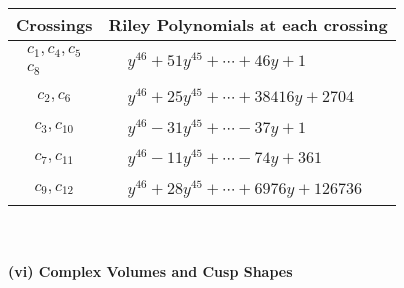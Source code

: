 \documentclass[1p]{elsarticle_modified}
\theoremstyle{definition}
\begin{document}
\begin{tabular}{m{50pt}|m{274pt}}
Crossings & \hspace{64pt}Riley Polynomials at each crossing \\
\hline $$\begin{aligned}c_{1},c_{4},c_{5}\\c_{8}\end{aligned}$$&$\begin{aligned}
&y^{46}+51 y^{45}+\cdots+46 y+1
\end{aligned}$\\
\hline $$\begin{aligned}c_{2},c_{6}\end{aligned}$$&$\begin{aligned}
&y^{46}+25 y^{45}+\cdots+38416 y+2704
\end{aligned}$\\
\hline $$\begin{aligned}c_{3},c_{10}\end{aligned}$$&$\begin{aligned}
&y^{46}-31 y^{45}+\cdots-37 y+1
\end{aligned}$\\
\hline $$\begin{aligned}c_{7},c_{11}\end{aligned}$$&$\begin{aligned}
&y^{46}-11 y^{45}+\cdots-74 y+361
\end{aligned}$\\
\hline $$\begin{aligned}c_{9},c_{12}\end{aligned}$$&$\begin{aligned}
&y^{46}+28 y^{45}+\cdots+6976 y+126736
\end{aligned}$\\
\hline
\end{tabular}\\~\\
\newpage\flushleft \textbf{(vi) Complex Volumes and Cusp Shapes}
\end{document}
